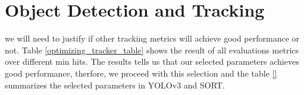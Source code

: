 \section{Object Detection and Tracking}
\label{sec:appendix/section_a}

we will need to justify if other tracking metrics will achieve good performance or not. Table \ref{optimizing_tracker_table} shows the result of all evaluations metrics over different min hits. The results tells us that our selected parameters achieves good performance, therfore, we proceed with this selection and the table \ref{} summarizes the selected parameters in YOLOv3 and SORT.
